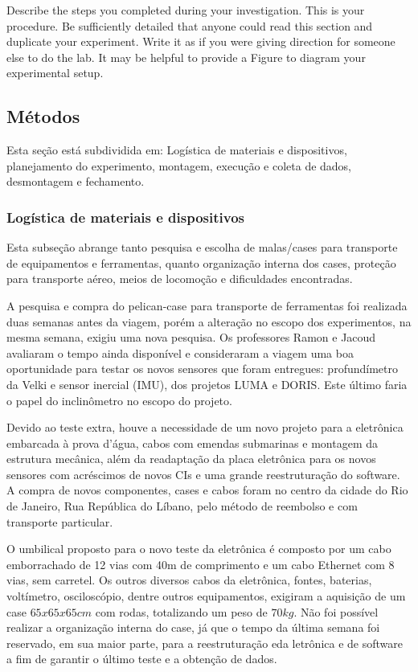 
Describe the steps you completed during your investigation. This is your procedure. Be sufficiently detailed that anyone could read this section and duplicate your experiment. Write it as if you were giving direction for someone else to do the lab. It may be helpful to provide a Figure to diagram your experimental setup.


\subsection{Métodos}
Esta seção está subdividida em: Logística de materiais e dispositivos,
planejamento do experimento, montagem, execução e coleta de dados,
desmontagem e fechamento.

\subsubsection{Logística de materiais e dispositivos}
Esta subseção abrange tanto pesquisa e escolha de malas/cases para
transporte de equipamentos e ferramentas, quanto organização interna dos
cases, proteção para transporte aéreo, meios de locomoção e dificuldades
encontradas.

A pesquisa e compra do pelican-case para transporte de ferramentas foi
realizada duas semanas antes da viagem, porém a alteração no escopo dos experimentos, na mesma
semana, exigiu uma nova pesquisa. Os professores Ramon e Jacoud avaliaram o
tempo ainda disponível e consideraram a viagem uma boa oportunidade para testar
os novos sensores que foram entregues:
profundímetro da Velki e sensor inercial (IMU), dos projetos LUMA e DORIS. Este
último faria o papel do inclinômetro no escopo do projeto. 

Devido ao teste extra, houve a necessidade de um novo projeto para a eletrônica
embarcada à prova d'água, cabos com emendas submarinas e montagem da estrutura mecânica, além da readaptação da placa eletrônica para os novos sensores com acréscimos de novos
CIs e uma grande reestruturação do software. A compra de novos componentes,
cases e cabos foram no centro da cidade do Rio de Janeiro, Rua República do
Líbano, pelo método de reembolso e com transporte particular.

O umbilical proposto para o novo teste da eletrônica é composto por um cabo
emborrachado de 12 vias com 40m de comprimento e um cabo Ethernet com 8 vias,
sem carretel.
Os outros diversos cabos da eletrônica, fontes, baterias, voltímetro,
osciloscópio, dentre outros equipamentos, exigiram a aquisição de um case
$65x65x65cm$ com rodas, totalizando um peso de $70kg$. Não foi possível realizar
a organização interna do case, já que o tempo da última semana foi reservado, em
sua maior parte, para a reestruturação eda letrônica e de software a fim de
garantir o último teste e a obtenção de dados.

